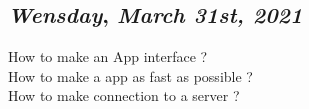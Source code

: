 \begin{center}
\section*{\month}
\end{center}

\def\day{\textit{March 31st, 2021}}
\def\weekday{\textit{Wensday}}
\subsection*{\weekday, \day}
How to make an App interface  ? \\
How to make a app as fast as possible ? \\
How to make connection to a server ?  \\
